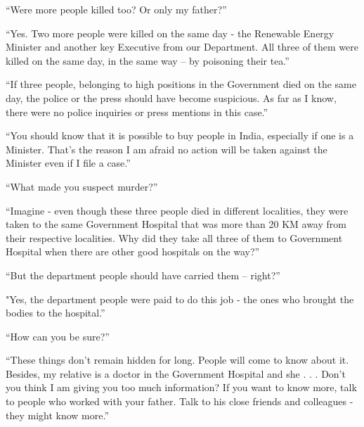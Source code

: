 “Were more people killed too? Or only my father?”

“Yes. Two more people were killed on the same day - the Renewable Energy
Minister and another key Executive from our Department. All three of them were
killed on the same day, in the same way – by poisoning their tea.”

“If three people, belonging to high positions in the Government died on the same
day, the police or the press should have become suspicious. As far as I know,
there were no police inquiries or press mentions in this case.”

“You should know that it is possible to buy people in India, especially if one
is a Minister. That's the reason I am afraid no action will be taken against the
Minister even if I file a case.”

“What made you suspect murder?”

“Imagine - even though these three people died in different localities, they
were taken to the same Government Hospital that was more than 20 KM away from
their respective localities. Why did they take all three of them to Government
Hospital when there are other good hospitals on the way?”

“But the department people should have carried them – right?”

"Yes, the department people were paid to do this job - the ones who brought the
bodies to the hospital.”

“How can you be sure?”

“These things don't remain hidden for long. People will come to know about it.
Besides, my relative is a doctor in the Government Hospital and she . . . Don't
you think I am giving you too much information? If you want to know more, talk
to people who worked with your father. Talk to his close friends and colleagues
- they might know more.”
